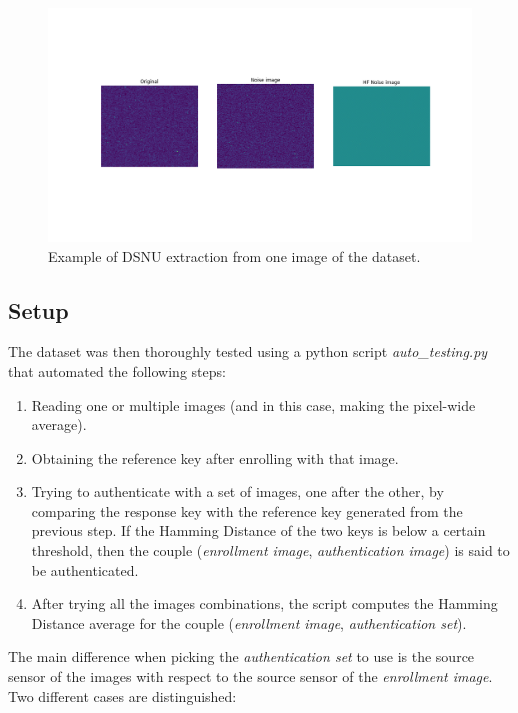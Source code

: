 \begin{figure}[h!]
	\vspace{0.5cm}
	\centering
	\includegraphics[width=\textwidth]{images/DSNU_S2S1I1.png}
	\caption{Example of DSNU extraction from one image of the dataset.}
	\label{fig:dataset}
\end{figure} 

\subsection{Setup}
The dataset was then thoroughly tested using a python script \emph{auto\_testing.py} that automated the following steps:

\begin{enumerate}
	\item Reading one or multiple images (and in this case, making the pixel-wide average).
	\item Obtaining the reference key after enrolling with that image.
	\item Trying to authenticate with a set of images, one after the other, by comparing the response key with the reference key generated from the previous step. If the Hamming Distance of the two keys is below a certain threshold, then the couple (\emph{enrollment image}, \emph{authentication image}) is said to be authenticated.
	\item After trying all the images combinations, the script computes the Hamming Distance average for the couple (\emph{enrollment image}, \emph{authentication set}).
\end{enumerate}

The main difference when picking the \emph{authentication set} to use is the source sensor of the images with respect to the source sensor of the \emph{enrollment image}. Two different cases are distinguished:

